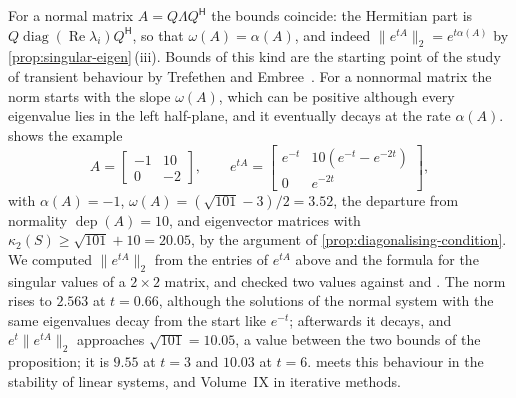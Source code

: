 For a normal matrix $A=Q\Lambda Q^{\mathsf H}$ the bounds coincide: the Hermitian part is $Q\operatorname{diag}(\operatorname{Re}\lambda_i)Q^{\mathsf H}$, so that $\omega(A)=\alpha(A)$, and indeed $\|e^{tA}\|_2=e^{t\alpha(A)}$ by \cref{prop:singular-eigen}\,(iii). Bounds of this kind are the starting point of the study of transient behaviour by Trefethen and Embree~\cite{trefethen2005}. For a nonnormal matrix the norm starts with the slope $\omega(A)$, which can be positive although every eigenvalue lies in the left half-plane, and it eventually decays at the rate $\alpha(A)$.  shows the example
\[
A=\begin{bmatrix}-1&10\\0&-2\end{bmatrix},\qquad e^{tA}=\begin{bmatrix}e^{-t}&10(e^{-t}-e^{-2t})\\0&e^{-2t}\end{bmatrix},
\]
with $\alpha(A)=-1$, $\omega(A)=(\sqrt{101}-3)/2=3.52$, the departure from normality $\operatorname{dep}(A)=10$, and eigenvector matrices with $\kappa_2(S)\ge\sqrt{101}+10=20.05$, by the argument of \cref{prop:diagonalising-condition}. We computed $\|e^{tA}\|_2$ from the entries of $e^{tA}$ above and the formula for the singular values of a $2\times2$ matrix, and checked two values against  and . The norm rises to $2.563$ at $t=0.66$, although the solutions of the normal system with the same eigenvalues decay from the start like $e^{-t}$; afterwards it decays, and $e^t\|e^{tA}\|_2$ approaches $\sqrt{101}=10.05$, a value between the two bounds of the proposition; it is $9.55$ at $t=3$ and $10.03$ at $t=6$.  meets this behaviour in the stability of linear systems, and Volume~IX in iterative methods.

